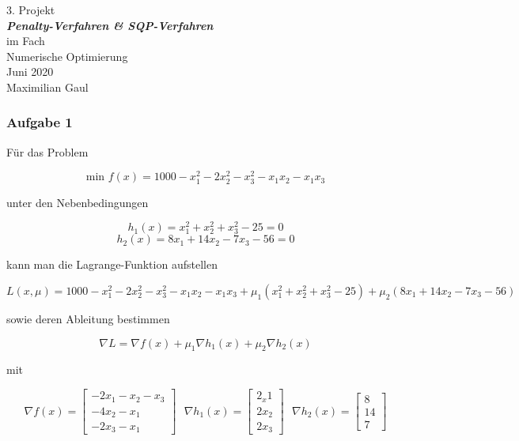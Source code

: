 \documentclass[a4paper, 12pt]{report}
\begin{document}
\begin{center}
    \vspace*{2em}
    \normalsize 3. Projekt\\
    \vspace*{1em}
    \normalsize \textbf{\textit{Penalty-Verfahren \& SQP-Verfahren}}\\
    \vspace*{4em}
    \normalsize im Fach\\
    \vspace*{1em}
    \large Numerische Optimierung\\
    \vspace*{30em}
    \normalsize Juni 2020\\
    \vspace*{1em}
    \normalsize Maximilian Gaul
\end{center}

\thispagestyle{empty}

\newpage

\subsubsection{Aufgabe 1}
Für das Problem

$$\text{min } f(x) = 1000 - x_1^2 - 2x_2^2 - x_3^2 - x_1x_2 - x_1x_3$$

unter den Nebenbedingungen

$$h_1(x) = x_1^2 + x_2^2 + x_3^2 - 25 = 0$$
$$h_2(x) = 8x_1 + 14x_2 - 7x_3 - 56 = 0$$

kann man die Lagrange-Funktion aufstellen

$$L(x, \mu) = 1000 - x_1^2 - 2x_2^2 - x_3^2 - x_1x_2 - x_1x_3 + \mu_1 (x_1^2 + x_2^2 + x_3^2 - 25) + \mu_2 (8x_1 + 14x_2 - 7x_3 - 56)$$

sowie deren Ableitung bestimmen

$$\nabla L = \nabla f(x) + \mu_1\nabla h_1(x) + \mu_2 \nabla h_2(x)$$

mit

$$\nabla f(x) = \begin{bmatrix}-2x_1 - x_2 - x_3\\-4x_2 - x_1\\-2x_3-x_1\end{bmatrix} \text{  } \nabla h_1(x) = \begin{bmatrix}2_x1\\2x_2\\2x_3\end{bmatrix} \text{  } \nabla h_2(x) = \begin{bmatrix}8\\14\\7\end{bmatrix}$$
\end{document}
